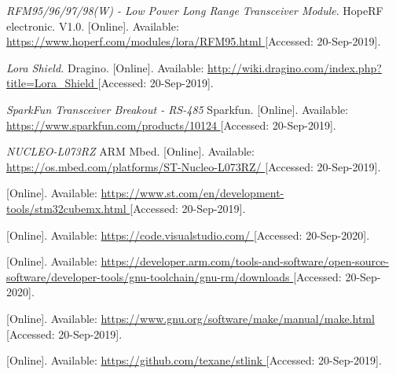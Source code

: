 \begin{thebibliography}{9}

\textit{
RFM95/96/97/98(W) - Low Power Long Range Transceiver Module}.
HopeRF electronic.
V1.0.
[Online]. Available:
\url{
https://www.hoperf.com/modules/lora/RFM95.html
}
[Accessed: 20-Sep-2019].



\textit{
Lora Shield.
}
Dragino.
[Online]. Available:
\url{
http://wiki.dragino.com/index.php?title=Lora_Shield
}
[Accessed: 20-Sep-2019].



\textit{
SparkFun Transceiver Breakout - RS-485
}
Sparkfun.
[Online]. Available:
\url{
https://www.sparkfun.com/products/10124
}
[Accessed: 20-Sep-2019].



\textit{
NUCLEO-L073RZ
}
ARM Mbed.
[Online]. Available:
\url{
https://os.mbed.com/platforms/ST-Nucleo-L073RZ/
}
[Accessed: 20-Sep-2019].



[Online]. Available:
\url{
https://www.st.com/en/development-tools/stm32cubemx.html
}
[Accessed: 20-Sep-2019].



[Online]. Available:
\url{
https://code.visualstudio.com/
}
[Accessed: 20-Sep-2020].



[Online]. Available:
\url{
https://developer.arm.com/tools-and-software/open-source-software/developer-tools/gnu-toolchain/gnu-rm/downloads
}
[Accessed: 20-Sep-2020].



[Online]. Available:
\url{
https://www.gnu.org/software/make/manual/make.html
}
[Accessed: 20-Sep-2019].



[Online]. Available:
\url{
https://github.com/texane/stlink
}
[Accessed: 20-Sep-2019].




\end{thebibliography}
